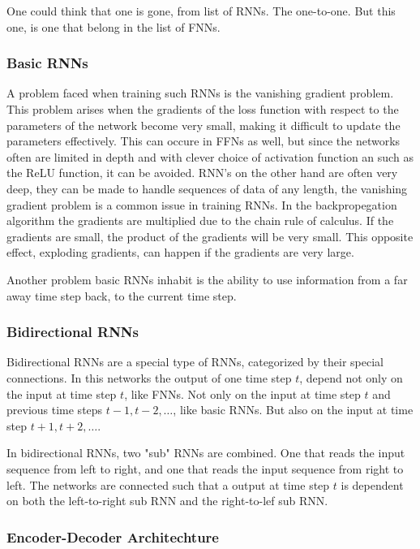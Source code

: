 One could think that one is gone, from list of RNNs.
The one-to-one. 
But this one, is one that belong in the list of FNNs. 


\subsubsection{Basic RNNs}

A problem faced when training such RNNs is the vanishing gradient problem.
This problem arises when the gradients of the loss function with respect to the parameters of the network
become very small, making it difficult to update the parameters effectively.
This can occure in FFNs as well, but since
the networks often are limited in depth and with clever choice of activation function an such as the 
ReLU function, it can be avoided. 
RNN's on the other hand are often very deep, they can be made to handle sequences of data of any length,
the vanishing gradient problem is a common issue in training RNNs. In the backpropegation algorithm the gradients are multiplied
due to the chain rule of calculus. If the gradients are small, the product of the gradients will be very small.
This opposite effect, exploding gradients, can happen if the gradients are very large.

Another problem basic RNNs inhabit is the ability to use information from a far away
time step back, to the current time step. 


\subsubsection{Bidirectional RNNs}

Bidirectional RNNs are a special type of RNNs, categorized by their special connections.
In this networks the output of one time step $t$, depend not only on
the input at time step $t$, like FNNs. Not only on the input at time step $t$ and
previous time steps $t-1, t-2, \dots$, like basic RNNs. But also on the input at time step $t+1, t+2, \dots$.

In bidirectional RNNs, two "sub" RNNs are combined. One that reads the input sequence from left to right,
and one that reads the input sequence from right to left. The networks are
connected such that a output at time step $t$ is dependent on both the
left-to-right sub RNN and the right-to-lef sub RNN.

\subsubsection{Encoder-Decoder Architechture}

